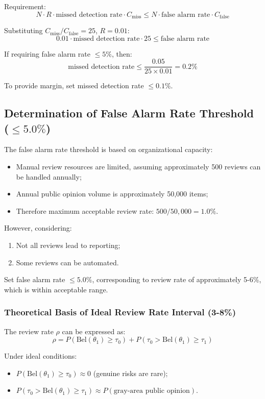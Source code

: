 \documentclass[11pt,a4paper]{report}
\begin{document}
Requirement:
\[
N \cdot R \cdot \text{missed detection rate} \cdot C_{\text{miss}} \leq N \cdot \text{false alarm rate} \cdot C_{\text{false}}
\]

Substituting $C_{\text{miss}} / C_{\text{false}} = 25$, $R = 0.01$:
\[
0.01 \cdot \text{missed detection rate} \cdot 25 \leq \text{false alarm rate}
\]

If requiring false alarm rate $\leq 5\%$, then:
\[
\text{missed detection rate} \leq \frac{0.05}{25 \times 0.01} = 0.2\%
\]

To provide margin, set missed detection rate $\leq 0.1\%$.

\subsection{Determination of False Alarm Rate Threshold ($\leq 5.0\%$)}

The false alarm rate threshold is based on organizational capacity:
\begin{itemize}
    \item Manual review resources are limited, assuming approximately 500 reviews can be handled annually;
    \item Annual public opinion volume is approximately 50,000 items;
    \item Therefore maximum acceptable review rate: $500 / 50,000 = 1.0\%$.
\end{itemize}

However, considering:
\begin{enumerate}
    \item Not all reviews lead to reporting;
    \item Some reviews can be automated.
\end{enumerate}

Set false alarm rate $\leq 5.0\%$, corresponding to review rate of approximately 5-6\%, which is within acceptable range.

\subsubsection{Theoretical Basis of Ideal Review Rate Interval (3-8\%)}

The review rate $\rho$ can be expressed as:
\[
\rho = P(\mathrm{Bel}(\theta_1) \geq \tau_0) + P(\tau_0 > \mathrm{Bel}(\theta_1) \geq \tau_1)
\]

Under ideal conditions:
\begin{itemize}
    \item $P(\mathrm{Bel}(\theta_1) \geq \tau_0) \approx 0$ (genuine risks are rare);
    \item $P(\tau_0 > \mathrm{Bel}(\theta_1) \geq \tau_1) \approx P(\text{gray-area public opinion})$.
\end{itemize}
\end{document}
